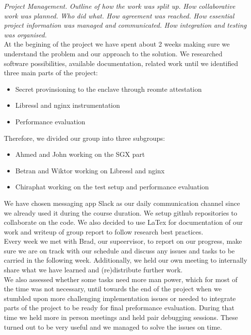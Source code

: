 \documentclass[../main.tex]{subfiles}
\begin{document}
\textit{Project Management. Outline of how the work was split up. How
collaborative work was planned. Who did what. How agreement was reached. How
essential project information was managed and communicated. How integration
and testing was organised.}\\

\noindent
At the begining of the project we have spent about 2 weeks making sure we
understand the problem and our approach to the solution. We researched
software possibilities, available documentation, related work until we
identified three main parts of the project:

\begin{itemize}
	\item Secret provinsioning to the enclave through reomte attestation
	\item Libressl and nginx instrumentation
	\item Performance evaluation
\end{itemize}

\noindent
Therefore, we divided our group into three subgroups:
\begin{itemize}
	\item Ahmed and John working on the SGX part
	\item Betran and Wiktor working on Libressl and nginx
	\item Chiraphat working on the test setup and performance evaluation
\end{itemize}

\noindent
We have chosen messaging app Slack as our daily communication channel since we
already used it during the course duration. We setup github repositories to
collaborate on the code. We also decided to use LaTex for documentation of our
work and writeup of group report to follow research best practices.\\

\noindent
Every week we met with Brad, our supeervisor, to report on our progress, make
sure we are on track with our schedule and discuss any issues and tasks to be
carried in the following week. Additionally, we held our own meeting to
internally share what we have learned and (re)distribute further work.\\

\noindent
We also assessed whether some tasks need more man power, which for most of the
time was not necessary, until towards the end of the project when we stumbled
upon more challenging implementation issues or needed to integrate parts of
the project to be ready for final preformance evaluation. During that time we
held more in person meetings and held pair debugging sessions. These turned
out to be very useful and we managed to solve the issues on time.
\end{document}
